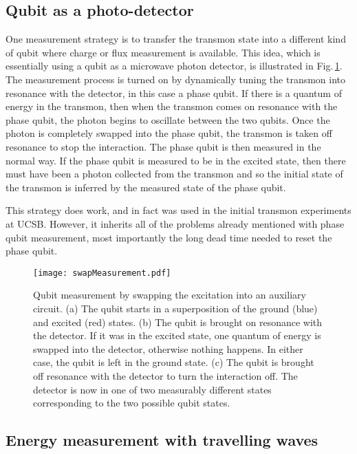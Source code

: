 \subsection{Qubit as a photo-detector}

One measurement strategy is to transfer the transmon state into a different kind of qubit where charge or flux measurement is available.
This idea, which is essentially using a qubit as a microwave photon detector, is illustrated in Fig.\,\ref{Fig:swapMeasurement}.
The measurement process is turned on by dynamically tuning the transmon into resonance with the detector, in this case a phase qubit.
If there is a quantum of energy in the transmon, then when the transmon comes on resonance with the phase qubit, the photon begins to oscillate between the two qubits.
Once the photon is completely swapped into the phase qubit, the transmon is taken off resonance to stop the interaction.
The phase qubit is then measured in the normal way.
If the phase qubit is measured to be in the excited state, then there must have been a photon collected from the transmon and so the initial state of the transmon is inferred by the measured state of the phase qubit.

This strategy does work, and in fact was used in the initial transmon experiments at UCSB.
However, it inherits all of the problems already mentioned with phase qubit measurement, most importantly the long dead time needed to reset the phase qubit.

\begin{figure}
\begin{centering}
\texttt{[image: swapMeasurement.pdf]} 
\par\end{centering}
\caption{Qubit measurement by swapping the excitation into an auxiliary circuit. (a) The qubit starts in a superposition of the ground (blue) and excited (red) states. (b) The qubit is brought on resonance with the detector. If it was in the excited state, one quantum of energy is swapped into the detector, otherwise nothing happens. In either case, the qubit is left in the ground state. (c) The qubit is brought off resonance with the detector to turn the interaction off. The detector is now in one of two measurably different states corresponding to the two possible qubit states.}
\label{Fig:swapMeasurement}
\end{figure}

\subsection{Energy measurement with travelling waves}

